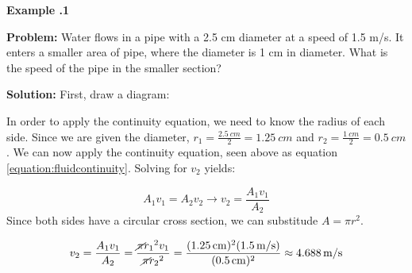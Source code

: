 	\begin{mdframed}[backgroundcolor=blue!10!white]
	\begin{center}
		
		
		\textbf{Example \thesection.1}	
	\end{center}
	
	\textbf{Problem: } Water flows in a pipe with a 2.5 cm diameter at a speed of 1.5 m/s.  It enters a smaller area of pipe, where the diameter is 1 cm in diameter.  What is the speed of the pipe in the smaller section?  
	\vspace{.1in}
	
	\textbf{Solution:} First, draw a diagram:
	
		\vspace{.1in}
		
	\vspace{0.1 in}
	
	In order to apply the continuity equation, we need to know the radius of each side.  Since we are given the diameter, $r_1 = \frac{\SI{2.5}{cm}}{2} = \SI{1.25}{cm}$ and $r_2 = \frac{\SI{1}{cm}}{2} = \SI{0.5}{cm}$.  We can now apply the continuity equation, seen above as equation \ref{equation:fluidcontinuity}.  Solving for $v_2$ yields:
	
	
	\begin{equation*}
		A_1 v_1 = A_2 v_2 \longrightarrow v_2 = \frac{A_1 v_1} {A_2}
	\end{equation*}
	Since both sides have a circular cross section, we can substitude $A=\pi r^2$.  
	
		\begin{equation*}
		v_2 = \frac{A_1 v_1} {A_2} = \frac{\cancel{\pi} {r_1}^2 v_1}{\cancel{\pi} {r_2}^2} = \frac{(\SI{1.25}{cm})^2(\SI{1.5}{m/s})}{(\SI{0.5}{cm})^2} \approx \SI{4.688}{m/s}
	\end{equation*}
	
\end{mdframed}
\vspace{0.1in}



